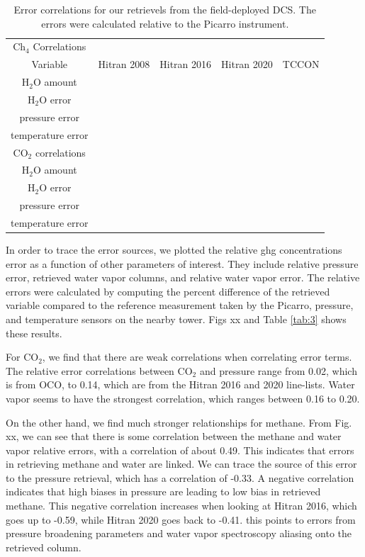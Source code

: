 \documentclass[amt, manuscript]{copernicus}
\begin{document}
\begin{table}
  \centering
  \begin{tabular}{| c | c | c | c | c |}
    Ch$_4$ Correlations & & & \\
    Variable & Hitran 2008 & Hitran 2016 & Hitran 2020 & TCCON \\
    \hline 
    H$_2$O amount & & & \\
    H$_2$O error & & & & \\
    pressure error & & & & \\
    temperature error & & & & \\
    \hline
    CO$_2$ correlations & & & & \\
        H$_2$O amount & & & \\
    H$_2$O error & & & & \\
    pressure error & & & & \\
    temperature error & & & & \\
    \hline

  \end{tabular}
  \caption{Error correlations for our retrievels from the field-deployed DCS. The errors were calculated relative to the Picarro instrument.}
  \label{tab:2}
\end{table}
In order to trace the error sources, we plotted the relative ghg concentrations error as a function of other parameters of interest. They include relative pressure error, retrieved water vapor columns, and relative water vapor error. The relative errors were calculated by computing the percent difference of the retrieved variable compared to the reference measurement taken by the Picarro, pressure, and temperature sensors on the nearby tower. Figs xx and Table \ref{tab:3} shows these results. 

For CO$_2$, we find that there are weak correlations when correlating error terms. The relative error correlations between CO$_2$ and pressure range from 0.02, which is from OCO, to 0.14, which are from the Hitran 2016 and 2020 line-lists. Water vapor seems to have the strongest correlation, which ranges between 0.16 to 0.20. 

On the other hand, we find much stronger relationships for methane. From Fig. xx, we can see that there is some correlation between the methane and water vapor relative errors, with a correlation of about 0.49. This indicates that errors in retrieving methane and water are linked. We can trace the source of this error to the pressure retrieval, which has a correlation of -0.33. A negative correlation indicates that high biases in pressure are leading to low bias in retrieved methane. This negative correlation increases when looking at Hitran 2016, which goes up to -0.59, while Hitran 2020 goes back to -0.41. this points to errors from pressure broadening parameters and water vapor spectroscopy aliasing onto the retrieved column.
\end{document}

